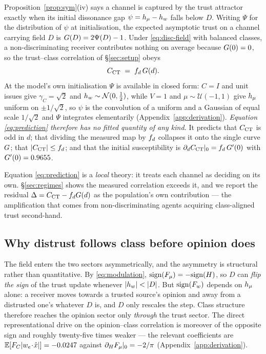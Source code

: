 Proposition~\ref{prop:sym}(iv) says a channel is captured by the trust attractor
exactly when its initial dissonance gap $\psi=h_{\mu}-h_{w}$ falls below $D$. Writing
$\Psi$ for the distribution of $\psi$ at initialisation, the expected asymptotic
trust on a channel carrying field $D$ is $G(D)=2\Psi(D)-1$. Under
\eqref{eq:disc-field} with balanced classes, a non-discriminating receiver
contributes nothing on average because $G(0)=0$, so the trust--class
correlation of \S\ref{sec:setup} obeys
%
\begin{equation}
  C_{\mathrm{CT}} \;=\; f_{d}\,G(d).
  \label{eq:prediction}
\end{equation}
%
At the model's own initialisation $\Psi$ is available in closed form: $C=I$ and
unit issues give $\gamma_C=\sqrt2$ and $h_{w}\sim\mathcal{N}(0,\tfrac12)$, while
$V=1$ and $\mu\sim\mathcal{U}(-1,1)$ give $h_{\mu}$ uniform on
$\pm1/\sqrt2$, so $\psi$ is the convolution of a uniform and a Gaussian of equal
scale $1/\sqrt2$ and $\Psi$ integrates elementarily
(Appendix~\ref{app:derivation}). \emph{Equation \eqref{eq:prediction} therefore
has no fitted quantity of any kind.} It predicts that $C_{\mathrm{CT}}$ is odd in $d$; that
dividing the measured map by $f_{d}$ collapses it onto the single curve $G$;
that $|C_{\mathrm{CT}}|\le f_{d}$; and that the initial susceptibility is
$\partial_dC_{\mathrm{CT}}|_{0}=f_{d}\,G'(0)$ with $G'(0)=0.9655$.

Equation \eqref{eq:prediction} is a \emph{local} theory: it treats each channel
as deciding on its own. \S\ref{sec:regimes} shows the measured correlation
exceeds it, and we report the residual $\Delta=C_{\mathrm{CT}}-f_{d}G(d)$ as the
population's own contribution --- the amplification that comes from
non-discriminating agents acquiring class-aligned trust second-hand.

\subsection{Why distrust follows class before opinion does}
\label{sec:ordering}

The field enters the two sectors asymmetrically, and the asymmetry is structural
rather than quantitative. By \eqref{eq:modulation},
$\mathrm{sign}(F_{\mu})=-\mathrm{sign}(H)$, so $D$ can \emph{flip the sign} of the
trust update whenever $|\hw|<|D|$. But $\mathrm{sign}(F_{w})$ depends on $h_{\mu}$
alone: a receiver moves towards a trusted source's opinion and away from a
distrusted one's whatever $D$ is, and $D$ only rescales the step. Class
structure therefore reaches the opinion sector only \emph{through} the trust
sector. The direct representational drive on the opinion--class correlation is
moreover of the opposite sign and roughly twenty-five times weaker --- the
relevant coefficients are $\mathbb{E}[F_{C}|w_e\!\cdot\!\hat{x}|]=-0.0247$ against
$\partial_{H}F_{\mu}|_0=-2/\pi$ (Appendix~\ref{app:derivation}).

